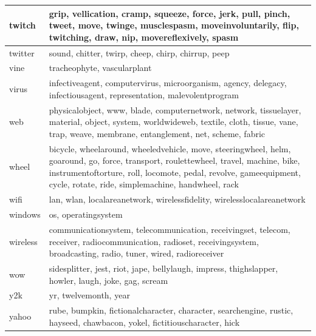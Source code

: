 \documentclass[12pt,a4paper]{report}
\begin{document}
\begin{table}[H]
\begin{center}
\begin{tabular}{|l|l|}
\hline
twitch & grip, vellication, cramp, squeeze, force, jerk, pull, pinch, tweet, move, twinge, musclespasm, moveinvoluntarily, flip, twitching, draw, nip, movereflexively, spasm\\
\hline
twitter & sound, chitter, twirp, cheep, chirp, chirrup, peep\\
\hline
vine & tracheophyte, vascularplant\\
\hline
virus & infectiveagent, computervirus, microorganism, agency, delegacy, infectiousagent, representation, malevolentprogram\\
\hline
web & physicalobject, www, blade, computernetwork, network, tissuelayer, material, object, system, worldwideweb, textile, cloth, tissue, vane, trap, weave, membrane, entanglement, net, scheme, fabric\\
\hline
wheel & bicycle, wheelaround, wheeledvehicle, move, steeringwheel, helm, goaround, go, force, transport, roulettewheel, travel, machine, bike, instrumentoftorture, roll, locomote, pedal, revolve, gameequipment, cycle, rotate, ride, simplemachine, handwheel, rack\\
\hline
wifi & lan, wlan, localareanetwork, wirelessfidelity, wirelesslocalareanetwork\\
\hline
windows & os, operatingsystem\\
\hline
wireless & communicationsystem, telecommunication, receivingset, telecom, receiver, radiocommunication, radioset, receivingsystem, broadcasting, radio, tuner, wired, radioreceiver\\
\hline
wow & sidesplitter, jest, riot, jape, bellylaugh, impress, thighslapper, howler, laugh, joke, gag, scream\\
\hline
y2k & yr, twelvemonth, year\\
\hline
yahoo & rube, bumpkin, fictionalcharacter, character, searchengine, rustic, hayseed, chawbacon, yokel, fictitiouscharacter, hick\\
\hline


\end{tabular}
\end{center}
\end{table}
	
\end{document}
